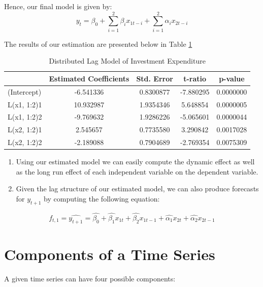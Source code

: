 \documentclass[]{book}
\theoremstyle{definition}
\theoremstyle{definition}
\theoremstyle{definition}
\theoremstyle{remark}
\begin{document}
Hence, our final model is given by: \begin{equation}
y_t= \beta_0 + \sum_{i=1}^2\beta_i x_{1t-i}+\sum_{i=1}^2\alpha_i x_{2t-i}
\end{equation}

The results of our estimation are presented below in Table
\ref{tab:ch2-table3}

\begin{table}

\caption{\label{tab:ch2-table3}Distributed Lag Model of Investment Expenditure}
\centering
\begin{tabular}[t]{lcccc}
\toprule
  & Estimated Coefficients & Std. Error & t-ratio & p-value\\
\midrule
(Intercept) & -6.541336 & 0.8300877 & -7.880295 & 0.0000000\\
L(x1, 1:2)1 & 10.932987 & 1.9354346 & 5.648854 & 0.0000005\\
L(x1, 1:2)2 & -9.769632 & 1.9286226 & -5.065601 & 0.0000044\\
L(x2, 1:2)1 & 2.545657 & 0.7735580 & 3.290842 & 0.0017028\\
L(x2, 1:2)2 & -2.189088 & 0.7904689 & -2.769354 & 0.0075309\\
\bottomrule
\end{tabular}
\end{table}

\begin{enumerate}
\def\labelenumi{\arabic{enumi}.}
\item
  Using our estimated model we can easily compute the dynamic effect as
  well as the long run effect of each independent variable on the
  dependent variable.
\item
  Given the lag structure of our estimated model, we can also produce
  forecasts for \(y_{t+1}\) by computing the following equation:
\end{enumerate}

\begin{equation}
f_{t,1}=\widehat{y_{t+1}}=\hat{\beta_0}+\hat{\beta_1}x_{1t} + \hat{\beta_2}x_{1t-1}+ \hat{\alpha_1}x_{2t}+\hat{\alpha_2}x_{2t-1}
\end{equation}

\hypertarget{components-of-a-time-series}{%
\chapter{Components of a Time
Series}\label{components-of-a-time-series}}

A given time series can have four possible components:
\end{document}
